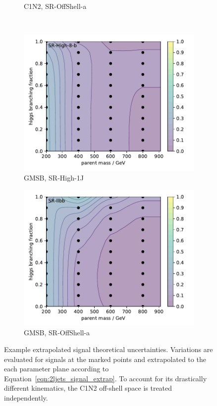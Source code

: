 \begin{figure}[tp]
\begin{subfigure}{0.48\textwidth}
\caption{C1N2, SR-OffShell-a}
\end{subfigure}
\\[0.5em]
\begin{subfigure}{0.48\textwidth}
\centering
\includegraphics[width=\textwidth]{figures/2ljets_signal_sys_gmsb_SRHigh8_2.pdf}
\caption{GMSB, SR-High-1J}
\end{subfigure}
\hfill
\begin{subfigure}{0.48\textwidth}
\centering
\includegraphics[width=\textwidth]{figures/2ljets_signal_sys_gmsb_SRllbb.pdf}
\caption{GMSB, SR-OffShell-a}
\end{subfigure}
\caption[
Example extrapolated signal theoretical uncertainties
]{%
Example extrapolated signal theoretical uncertainties.
Variations are evaluated for signals at the marked points and extrapolated to
the each parameter plane according to Equation~\ref{eqn:2ljets_signal_extrap}.
To account for its drastically different kinematics, the C1N2 off-shell space
is treated independently.
}
\label{fig:2ljets_signal_sys_extrap}
\end{figure}


